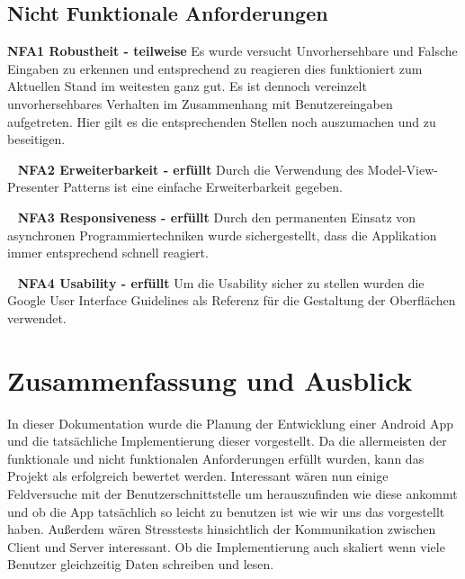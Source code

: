 \documentclass{scrartcl}
\begin{document}
\subsection{Nicht Funktionale Anforderungen}

\textbf{NFA1 Robustheit - teilweise} \newline
Es wurde versucht Unvorhersehbare und Falsche Eingaben zu erkennen und entsprechend zu reagieren dies funktioniert zum Aktuellen Stand im weitesten ganz gut. Es ist dennoch vereinzelt unvorhersehbares Verhalten im Zusammenhang mit Benutzereingaben aufgetreten. Hier gilt es die entsprechenden Stellen noch auszumachen und zu beseitigen.

\ \newline
\textbf{NFA2 Erweiterbarkeit - erfüllt} \newline
Durch die Verwendung des Model-View-Presenter Patterns ist eine einfache
Erweiterbarkeit gegeben.

\ \newline
\textbf{NFA3 Responsiveness - erfüllt} \newline
Durch den permanenten Einsatz von asynchronen Programmiertechniken wurde
sichergestellt, dass die Applikation immer entsprechend schnell reagiert.

\ \newline
\textbf{NFA4 Usability - erfüllt} \newline
Um die Usability sicher zu stellen wurden die Google User Interface Guidelines
als Referenz für die Gestaltung der Oberflächen verwendet.

\section{Zusammenfassung und Ausblick}

In dieser Dokumentation wurde die Planung der Entwicklung einer Android App und die tatsächliche Implementierung dieser vorgestellt. Da die allermeisten der funktionale und nicht funktionalen Anforderungen erfüllt wurden, kann das Projekt als erfolgreich bewertet werden. Interessant wären nun einige Feldversuche mit der Benutzerschnittstelle um herauszufinden wie diese ankommt und ob die App tatsächlich so leicht zu benutzen ist wie wir uns das vorgestellt haben.
Außerdem wären Stresstests hinsichtlich der Kommunikation zwischen Client und Server interessant. Ob die Implementierung auch skaliert wenn viele Benutzer gleichzeitig Daten schreiben und lesen.
\end{document}
